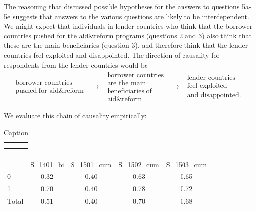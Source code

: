 The reasoning that discussed possible hypotheses for the answers to
questions 5a-5e suggests that answers to the various questions are likely to
be interdependent. We might expect that individuals in lender countries who
think that the borrower countries pushed for the aid\&reform programs
(questions 2 and 3) also think that these are the main beneficiaries
(question 3), and therefore think that the lender countries feel exploited
and disappointed. The direction of causality for respondents from the lender
countries would be%
\begin{equation*}
\begin{array}{ccccc}
\begin{array}{c}
\text{borrower countries} \\ 
\text{pushed for aid\&reform}%
\end{array}
& \rightarrow  & 
\begin{array}{c}
\text{borrower countries} \\ 
\text{are the main} \\ 
\text{beneficiaries of} \\ 
\text{aid\&reform}%
\end{array}
& \rightarrow  & 
\begin{array}{c}
\text{lender countries} \\ 
\text{feel exploited} \\ 
\text{and disappointed.}%
\end{array}%
\end{array}%
\end{equation*}


We evaluate this chain of causality empirically: 
\begin{table}[h!]
    \centering
    \begin{tabular}{c|c}
         &  \\
         & 
    \end{tabular}
    \caption{Caption}
    \label{tab:my_label}
\end{table}

\begin{table}[h!]
\centering
\begin{tabular}{l*{1}{cccc}}
\hline\hline
                    &\multicolumn{4}{c}{}                               \\
                    &   S\_1401\_bi&  S\_1501\_cum&  S\_1502\_cum&  S\_1503\_cum\\
\hline
0                   &        0.32&        0.40&        0.63&        0.65\\
1                   &        0.70&        0.40&        0.78&        0.72\\
Total               &        0.51&        0.40&        0.70&        0.68\\
\hline\hline
\end{tabular}
\end{table}


